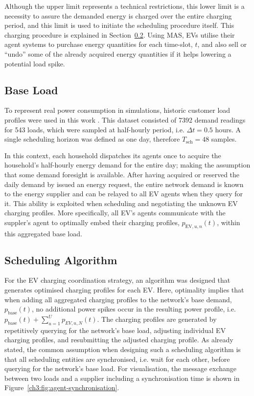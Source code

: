 

Although the upper limit represents a technical restrictions, this lower limit is a necessity to assure the demanded energy is charged over the entire charging period, and this limit is used to initiate the scheduling procedure itself.
This charging procedure is explained in Section~\ref{ch3:subsec:scheduling-algorithm}.
Using MAS, EVs utilise their agent systems to purchase energy quantities for each time-slot, $t$, and also sell or ``undo'' some of the already acquired energy quantities if it helps lowering a potential load spike.

\subsection{Base Load}


To represent real power consumption in simulations, historic customer load profiles were used in this work \cite{IrishData2002}.
This dataset consisted of 7392 demand readings for 543 loads, which were sampled at half-hourly period, i.e. $\Delta t = 0.5$ hours.
A single scheduling horizon was defined as one day, therefore $T_\text{sch}=48$ samples.

In this context, each household dispatches its agents once to acquire the household's half-hourly energy demand for the entire day; making the assumption that some demand foresight is available.
After having acquired or reserved the daily demand by issued an energy request, the entire network demand is known to the energy supplier and can be relayed to all EV agents when they query for it.
This ability is exploited when scheduling and negotiating the unknown EV charging profiles.
More specifically, all EV's agents communicate with the suppler's agent to optimally embed their charging profiles, $p_{\text{EV},u,n}(t)$, within this aggregated base load.

\subsection{Scheduling Algorithm}
\label{ch3:subsec:scheduling-algorithm}

For the EV charging coordination strategy, an algorithm was designed that generates optimised charging profiles for each EV.
Here, optimality implies that when adding all aggregated charging profiles to the network's base demand, $p_\text{base}(t)$, no additional power spikes occur in the resulting power profile, i.e. $p_\text{base}(t) + \sum_{u=1}^U p_{EV,u,N}(t)$.
The charging profiles are generated by repetitively querying for the network's base load, adjusting individual EV charging profiles, and resubmitting the adjusted charging profile.
As already stated, the common assumption when designing such a scheduling algorithm is that all scheduling entities are synchronised, i.e. wait for each other, before querying for the network's base load.
For visualisation, the message exchange between two loads and a supplier including a synchronisation time is shown in Figure~\ref{ch3:fig:agent-synchronisation}.

